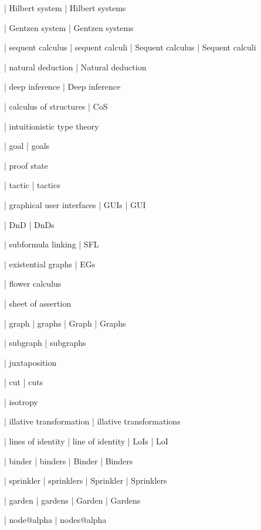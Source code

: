  | Hilbert system
 | Hilbert systems

 | Gentzen system
 | Gentzen systems

 | sequent calculus
 | sequent calculi
 | Sequent calculus
 | Sequent calculi

 | natural deduction
 | Natural deduction

 | deep inference
 | Deep inference

 | calculus of structures
 | CoS
 
 | intuitionistic type theory
 
 | goal
 | goals

 | proof state

 | tactic
 | tactics

 | graphical user interfaces
 | GUIs
 | GUI

 | DnD
 | DnDs

 | subformula linking
 | SFL

 | existential graphs
 | EGs

 | flower calculus


 | sheet of assertion
 
 | graph
 | graphs
 | Graph
 | Graphs

 | subgraph
 | subgraphs

 | juxtaposition

 | cut
 | cuts

 | isotropy

 | illative transformation
 | illative transformations

 | lines of identity
 | line of identity
 | LoIs
 | LoI

 | binder
 | binders
 | Binder
 | Binders

 | sprinkler
 | sprinklers
 | Sprinkler
 | Sprinklers

 | garden
 | gardens
 | Garden
 | Gardens

 | node@alpha
 | nodes@alpha

